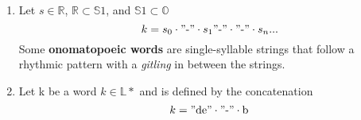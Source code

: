 \begin{enumerate}
      \item
            Let \(s \in \mathbb{R}\), \(\mathbb{R} \subset \mathbb{S}1\), and \(\mathbb{S}1 \subset \mathbb{O}\)
            \[
                  k = s_0 \cdot "\text{-}" \cdot s_1 "\text{-}" \cdot "\text{-}" \cdot s_n ...
            \]
            Some \textbf{onomatopoeic words} are single-syllable strings that follow a rhythmic pattern with a \textit{gitling} in between the strings.
      \item Let k be a word \(k \in \mathbb{L}*\) and is defined by the concatenation
            \[
                  k = "\text{de}" \cdot "\text{-}" \cdot \text{b}
            \]
\end{enumerate}